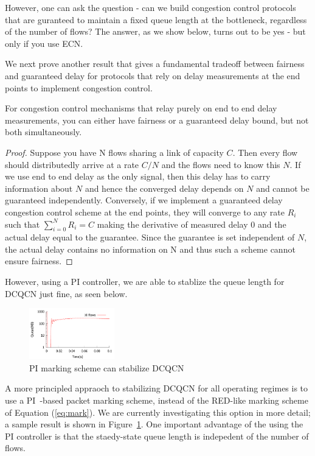 However, one can ask the question - can we build congestion control protocols
that are guranteed to maintain a fixed queue length at the bottleneck,
regardless of the number of flows? The answer, as we show below, turns out to be
yes - but only if you use ECN.

We next prove another result that gives a fundamental tradeoff between fairness
and guaranteed delay for protocols that rely on delay measurements at the end
points to implement congestion control.

\begin{thm}
For congestion control mechanisms that relay purely on end to end
delay measurements, you can either have fairness or a guaranteed delay
bound, but not both simultaneously.
\end{thm}
\begin{proof}
Suppose you have N flows sharing a link of capacity $C$. Then every flow
should distributedly arrive at a rate $C/N$ and the flows need to know
this $N$. If we use end to end delay as the only signal, then this delay
has to carry information about $N$ and hence the converged delay
depends on $N$ and cannot be guaranteed independently. Conversely, if we implement a guaranteed delay congestion
control scheme at the end points, they
will converge to any rate $R_i$ such that $\sum_{i=0}^{N}R_i = C$
making the derivative of measured delay 0 and the actual delay equal
to the guarantee. Since the guarantee is set independent of $N$, the
actual delay contains no information on N and 
thus such a scheme cannot ensure fairness.
\end{proof}

However, using a PI controller, we are able to stablize the queue length for
DCQCN just fine, as seen below.

\begin{figure}
\center
\includegraphics[width=0.33\textwidth]{figures/stable_q_85_pi.pdf}
\caption{PI marking scheme can stabilize DCQCN}
\label{fig:dcqcn_pi}
\end{figure}

A more principled appraoch to stabilizing DCQCN for all operating regimes is to
use a PI~\cite{Hollot:PIController}-based packet marking scheme, instead of the
RED-like marking scheme of Equation (\ref{eq:mark}). We are currently
investigating this option in more detail; a sample result is shown in
Figure~\ref{fig:dcqcn_pi}. One important advantage of the using the PI
controller is that the staedy-state queue length is indepedent of the number of
flows.
